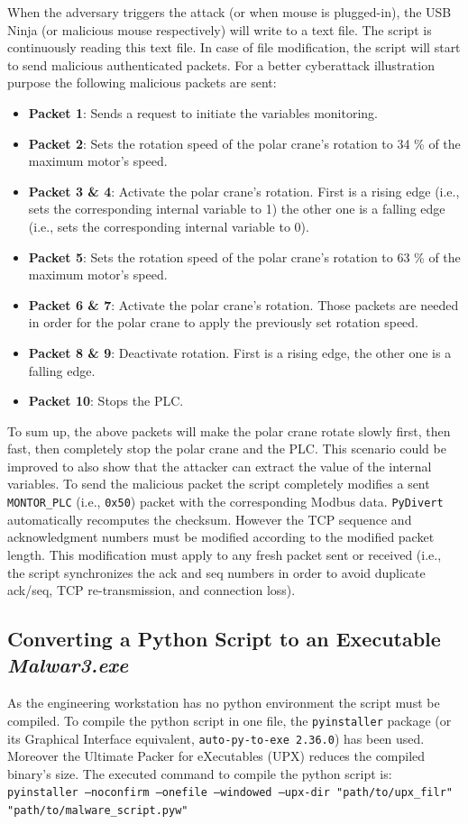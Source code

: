 When the adversary triggers the attack (or when mouse is plugged-in), the USB Ninja (or malicious mouse respectively) will write to a text file. The script is continuously reading this text file. In case of file modification, the script will start to send malicious authenticated packets. For a better cyberattack illustration purpose the following malicious packets are sent:

\begin{itemize}
    \item \textbf{Packet 1}: Sends a request to initiate the variables monitoring.
    \item \textbf{Packet 2}: Sets the rotation speed of the polar crane's rotation to 34 \% of the maximum motor's speed. 
    \item \textbf{Packet 3 \& 4}: Activate the polar crane's rotation. First is a rising edge (i.e., sets the corresponding internal variable to 1) the other one is a falling edge (i.e., sets the corresponding internal variable to 0).
    \item \textbf{Packet 5}:  Sets the rotation speed of the polar crane's rotation to 63 \% of the maximum motor's speed. 
    \item \textbf{Packet 6 \& 7}: Activate the polar crane's rotation. Those packets are needed in order for the polar crane to apply the previously set rotation speed.
    \item \textbf{Packet 8 \& 9}: Deactivate rotation. First is a rising edge,  the other one is a falling edge.
    \item \textbf{Packet 10}: Stops the PLC.
\end{itemize}

To sum up, the above packets will make the polar crane rotate slowly first, then fast, then completely stop the polar crane and the PLC. This scenario could be improved to also show that the attacker can extract the value of the internal variables. To send the malicious packet the script completely modifies a sent \texttt{MONTOR\_PLC} (i.e., \texttt{0x50}) packet with the corresponding Modbus data. \texttt{PyDivert} automatically recomputes the checksum. However the TCP sequence and acknowledgment numbers must be modified according to the modified packet length. This modification must apply to any fresh packet sent or received (i.e., the script synchronizes the ack and seq numbers in order to avoid duplicate ack/seq, TCP re-transmission, and connection loss).

\subsection{Converting a Python Script to an Executable \emph{Malwar3.exe}}

As the engineering workstation has no python environment the script must be compiled. To compile the python script in one file, the \texttt{pyinstaller} package (or its Graphical Interface equivalent, \texttt{auto-py-to-exe 2.36.0}) has been used. Moreover the Ultimate Packer for eXecutables (UPX) reduces the compiled binary's size. The executed command to compile the python script is: \texttt{pyinstaller --noconfirm --onefile --windowed --upx-dir "path/to/upx\_filr"  "path/to/malware\_script.pyw"}